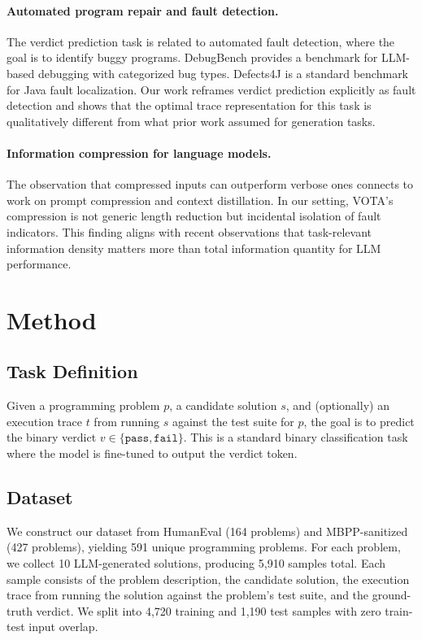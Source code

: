 \documentclass[11pt]{article}
\begin{document}
\paragraph{Automated program repair and fault detection.}
The verdict prediction task is related to automated fault detection, where the goal is to identify buggy programs. DebugBench \citep{debugbench2024} provides a benchmark for LLM-based debugging with categorized bug types. Defects4J \citep{defects4j} is a standard benchmark for Java fault localization. Our work reframes verdict prediction explicitly as fault detection and shows that the optimal trace representation for this task is qualitatively different from what prior work assumed for generation tasks.

\paragraph{Information compression for language models.}
The observation that compressed inputs can outperform verbose ones connects to work on prompt compression \citep{llmlingua2023} and context distillation. In our setting, VOTA's compression is not generic length reduction but incidental isolation of fault indicators. This finding aligns with recent observations that task-relevant information density matters more than total information quantity for LLM performance.

\section{Method}

\subsection{Task Definition}

Given a programming problem $p$, a candidate solution $s$, and (optionally) an execution trace $t$ from running $s$ against the test suite for $p$, the goal is to predict the binary verdict $v \in \{\texttt{pass}, \texttt{fail}\}$. This is a standard binary classification task where the model is fine-tuned to output the verdict token.

\subsection{Dataset}
\label{sec:dataset}

We construct our dataset from HumanEval (164 problems) and MBPP-sanitized (427 problems), yielding 591 unique programming problems. For each problem, we collect 10 LLM-generated solutions, producing 5,910 samples total. Each sample consists of the problem description, the candidate solution, the execution trace from running the solution against the problem's test suite, and the ground-truth verdict. We split into 4,720 training and 1,190 test samples with zero train-test input overlap.
\end{document}
